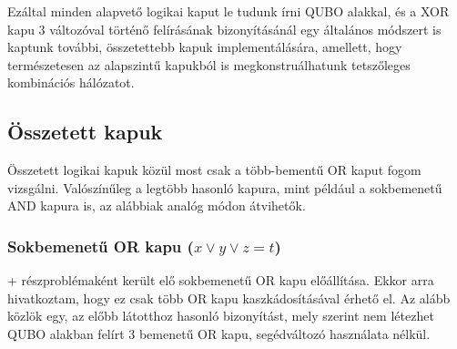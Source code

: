 Ezáltal minden alapvető logikai kaput le tudunk írni QUBO alakkal, és a XOR kapu 3 változóval történő felírásának bizonyításánál egy általános módszert is kaptunk további, összetettebb kapuk implementálására, amellett, hogy természetesen az alapszintű kapukból is megkonstruálhatunk tetszőleges kombinációs hálózatot.

\subsection{Összetett kapuk}

Összetett logikai kapuk közül most csak a több-bementű OR kaput fogom vizsgálni. Valószínűleg a legtöbb hasonló kapura, mint például a sokbemenetű AND kapura is, az alábbiak analóg módon átvihetők.

\subsubsection{Sokbemenetű OR kapu ($x \vee y \vee z = t$)} \label{sec:MORgate}

\Az+ részproblémaként került elő sokbemenetű OR kapu előállítása. Ekkor arra hivatkoztam, hogy ez csak több OR kapu kaszkádosításával érhető el. Az alább közlök egy, az előbb látotthoz hasonló bizonyítást, mely szerint nem létezhet QUBO alakban felírt 3 bemenetű OR kapu, segédváltozó használata nélkül.

